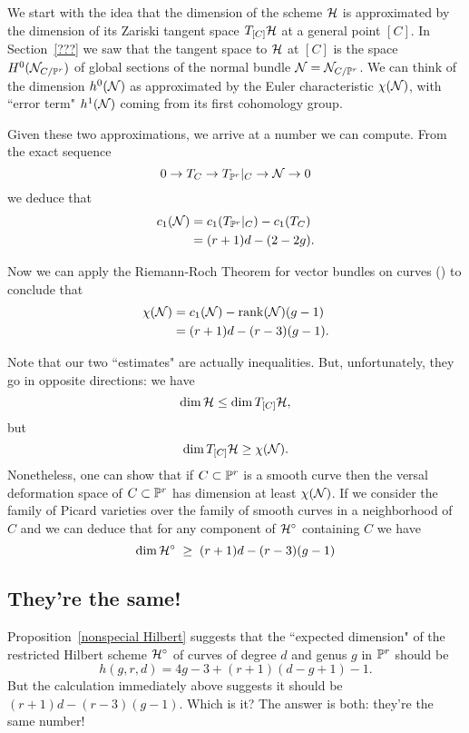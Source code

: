 We start with the idea that the dimension of the scheme $\cH$ is approximated by the dimension of its Zariski tangent space $T_{[C]}\cH$ at a general point $[C]$. In Section~\ref{???} we saw that the tangent space to $\cH$ at $[C]$ is the space $H^0(\cN_{C/\PP^r})$ of global sections of the normal bundle $\cN = \cN_{C/\PP^r}$. We can think of the dimension $h^0(\cN)$ as approximated by the Euler characteristic $\chi(\cN)$, with ``error term" $h^1(\cN)$ coming from its first cohomology group.

Given these two approximations, we arrive at a number we can  compute. From the exact sequence
$$
0 \to T_C \to T_{\PP^r}|_C \to \cN \to 0
$$
we deduce that
\begin{align*}
c_1(\cN) &= c_1(T_{\PP^r}|_C) - c_1(T_C) \\
&= (r+1)d - (2-2g).
\end{align*}

Now we can apply the Riemann-Roch Theorem for vector bundles on curves (\cite[Theorem ???]{3264}) to conclude that
\begin{align*}
\chi(\cN) &= c_1(\cN) - \rank(\cN)(g-1) \\
&= (r+1)d - (r-3)(g-1).
\end{align*}

Note that our two ``estimates" are actually inequalities. But, unfortunately, they go in opposite directions: we have
$$
\dim \cH \leq \dim T_{[C]}\cH,
$$
but 
$$
\dim T_{[C]}\cH \geq \chi(\cN).
$$
Nonetheless, one can show that if $C \subset \PP^r$ is a smooth curve then the versal deformation space of $C \subset \PP^r$ has dimension at least $\chi(\cN)$. If we consider the family of Picard varieties over the family of smooth curves in a neighborhood of $C$ and we can deduce that for any component of $\cH^\circ$ containing $C$ we have
$$
\dim \cH^\circ \; \geq \; (r+1)d - (r-3)(g-1)
$$

\subsection{They're the same!} Proposition~\ref{nonspecial Hilbert} suggests that the ``expected dimension" of the restricted Hilbert scheme $\cH^\circ$ of curves of degree $d$ and genus $g$ in $\PP^r$ should be 
$$
h(g,r,d) = 4g-3 + (r+1)(d-g+1) - 1.
$$
But the calculation immediately above suggests it should be $(r+1)d - (r-3)(g-1)$. Which is it? The answer is both: they're the same number!




